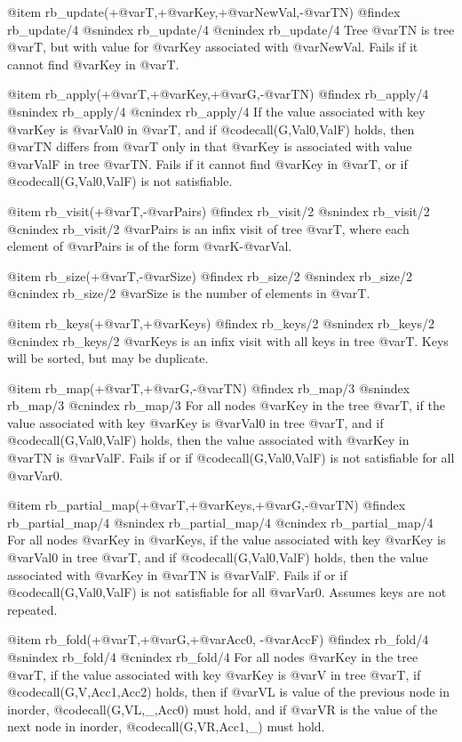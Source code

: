 @item rb_update(+@var{T},+@var{Key},+@var{NewVal},-@var{TN})
@findex rb_update/4
@snindex rb_update/4
@cnindex rb_update/4
Tree @var{TN} is tree @var{T}, but with value for @var{Key} associated
with @var{NewVal}. Fails if it cannot find @var{Key} in @var{T}.

@item rb_apply(+@var{T},+@var{Key},+@var{G},-@var{TN})
@findex rb_apply/4
@snindex rb_apply/4
@cnindex rb_apply/4
If the value associated with key @var{Key} is @var{Val0} in @var{T}, and
if @code{call(G,Val0,ValF)} holds, then @var{TN} differs from
@var{T} only in that @var{Key} is associated with value @var{ValF} in
tree @var{TN}. Fails if it cannot find @var{Key} in @var{T}, or if
@code{call(G,Val0,ValF)} is not satisfiable.

@item rb_visit(+@var{T},-@var{Pairs})
@findex rb_visit/2
@snindex rb_visit/2
@cnindex rb_visit/2
@var{Pairs} is an infix visit of tree @var{T}, where each element of
@var{Pairs} is of the form  @var{K}-@var{Val}.

@item rb_size(+@var{T},-@var{Size})
@findex rb_size/2
@snindex rb_size/2
@cnindex rb_size/2
@var{Size} is the number of elements in @var{T}.

@item rb_keys(+@var{T},+@var{Keys})
@findex rb_keys/2
@snindex rb_keys/2
@cnindex rb_keys/2
@var{Keys} is an infix visit with all keys in tree @var{T}. Keys will be
sorted, but may be duplicate.

@item rb_map(+@var{T},+@var{G},-@var{TN})
@findex rb_map/3
@snindex rb_map/3
@cnindex rb_map/3
For all nodes @var{Key} in the tree @var{T}, if the value associated with
key @var{Key} is @var{Val0} in tree @var{T}, and if
@code{call(G,Val0,ValF)} holds, then the value associated with @var{Key}
in @var{TN} is @var{ValF}. Fails if or if @code{call(G,Val0,ValF)} is not
satisfiable for all @var{Var0}.

@item rb_partial_map(+@var{T},+@var{Keys},+@var{G},-@var{TN})
@findex rb_partial_map/4
@snindex rb_partial_map/4
@cnindex rb_partial_map/4
For all nodes @var{Key} in @var{Keys}, if the value associated with key
@var{Key} is @var{Val0} in tree @var{T}, and if @code{call(G,Val0,ValF)}
holds, then the value associated with @var{Key} in @var{TN} is
@var{ValF}. Fails if or if @code{call(G,Val0,ValF)} is not satisfiable
for all @var{Var0}. Assumes keys are not repeated.

@item rb_fold(+@var{T},+@var{G},+@var{Acc0}, -@var{AccF})
@findex rb_fold/4
@snindex rb_fold/4
@cnindex rb_fold/4
    For all nodes @var{Key} in the tree @var{T}, if the value
associated with key @var{Key} is @var{V} in tree @var{T}, if
@code{call(G,V,Acc1,Acc2)} holds, then if @var{VL} is value of the
previous node in inorder, @code{call(G,VL,_,Acc0)} must hold, and if
@var{VR} is the value of the next node in inorder,
@code{call(G,VR,Acc1,_)} must hold.

